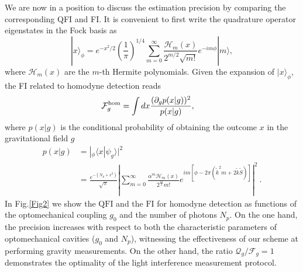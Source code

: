 \documentclass[aps,twocolumn,preprintnumbers,amsmath,amssymb]{revtex4}
\begin{document}
We are now in a position to discuss the estimation precision by comparing the corresponding QFI and FI. It is convenient to first write the quadrature operator eigenstates in the Fock basis as \cite{ferraro2005}
\begin{equation}\label{xphi}
  |x\rangle_{\phi}=e^{-x^2/2}\left(\frac{1}{\pi}\right)^{1/4}\sum_{m=0}^{\infty}\frac{\mathcal{H}_m(x)}{2^{m/2}\sqrt{m!}}e^{-im\phi}|m\rangle,
\end{equation}
where $\mathcal{H}_m(x)$ are the $m$-th Hermite polynomials. Given the expansion of $ |x\rangle_{\phi}$, the FI related to homodyne detection reads
\begin{equation}\begin{split}\label{FI}
\mathcal{F}_g^{\rm hom}&=\int dx\frac{(\partial_{g}p(x|g))^2}{p(x|g)},
\end{split}\end{equation}
where $p(x| g)$ is the conditional probability of obtaining the outcome $x$ in the gravitational field $g$
\begin{equation}\begin{split}\label{pxg}
p(x| g)&=|{}_\phi\langle x|\psi_{g}\rangle|^2\\
&=\frac{e^{-(N_p+x^2)}}{\sqrt{\pi}}\left|\sum_{m=0}^{\infty}\frac{\alpha^m\mathcal{H}_m(x)}{2^{\frac{m}{2}}m!}e^{im\left[\phi-2\pi(\tilde{k}^2m+2\tilde{k}\tilde{S})\right]}\right|^2\ .
\end{split}\end{equation}
In Fig.\ref{Fig2} we show the $\mathrm{QFI}$ and the $\mathrm{FI}$ for homodyne detection as functions of the optomechanical coupling $g_0$ and the number of photons $N_p$.
On the one hand, the precision increases with respect to both the characteristic parameters of optomechanical cavities ($g_0$ and $N_p$), witnessing the effectiveness of our scheme at performing gravity measurements. On the other hand, the ratio $\mathcal{Q}_g/\mathcal{F}_g=1$ demonstrates the optimality of the light interference measurement protocol.
\end{document}

